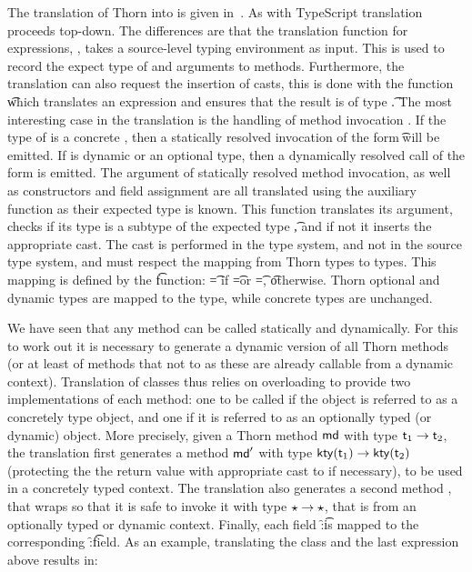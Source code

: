 \documentclass[acmlarge, anonymous, authordraft, review]{acmart} %
\begin{document}
The translation of Thorn into \kafka is given in~. As with
TypeScript translation proceeds top-down. The differences are that the
translation function for expressions, \TRG{\e}\Env, takes a source-level
typing environment as input. This is used to record the expect type of \this
and arguments \x to methods. Furthermore, the translation can also request
the insertion of casts, this is done with the function \TAG{\e}\Env\t which
translates an expression and ensures that the result is of type \t. The most
interesting case in the translation is the handling of method invocation
\Call\e\m\ep. If the type of \e is a concrete \C, then a statically resolved
invocation of the form \KCall\e\m\ep\t\tp will be emitted. If \e is dynamic
or an optional type, then a dynamically resolved call of the form
\DynCall\e\m\ep is emitted.  The argument of statically resolved method
invocation, as well as constructors and field assignment are all translated
using the auxiliary function as their expected type is known.  This function
translates its argument, checks if its type is a subtype of the expected
type \t, and if not it inserts the appropriate cast.  The cast is performed
in the \kafka type system, and not in the source type system, and must
respect the mapping from Thorn types to \kafka types.  This mapping is
defined by the \kty\t function: \kty\t = \any if \t=\dt\C or \t=\any, \t
otherwise.  Thorn optional and dynamic types are mapped to the \any type,
while concrete types are unchanged.

We have seen that any method can be called statically and dynamically. For
this to work out it is necessary to generate a dynamic version of all Thorn
methods (or at least of methods that not \any to \any as these are already
callable from a dynamic context).  Translation of classes thus relies on
overloading to provide two implementations of each method: one to be called
if the object is referred to as a concretely type object, and one if it is
referred to as an optionally typed (or dynamic) object.  More precisely,
given a Thorn method \(\md\) with type \(\t[1] \to \t[2]\), the \kafka
translation first generates a method \(\mdp\) with type \(\kty{\t[1]} \to
\kty{\t[2]}\) (protecting the the return value with appropriate cast to
\kty{\t[2]} if necessary), to be used in a concretely typed context.  The
\kafka translation also generates a second method \mdpp, that wraps \mdp so
that it is safe to invoke it with type \(\star \to \star\), that is from an
optionally typed or dynamic context.  Finally, each field \f:\t is mapped to
the corresponding \f:\kty\t field.
As an example, translating the class \A and the last expression above results in:
\end{document}
